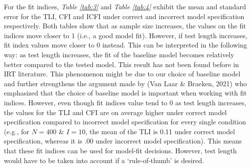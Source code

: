 \documentclass[Royal,sageapa,times,doublespace]{sagej}
\begin{document}
\indent For the fit indices, \textit{Table \ref{tab:3}} and \textit{Table \ref{tab:4}} exhibit the mean and standard error for the TLI, CFI and ICFI under correct and incorrect model specification respectively. Both tables show that as sample size increases, the values on the fit indices move closer to 1 (i.e., a good model fit). However, if test length increases, fit index values move closer to 0 instead. This can be interpreted in the following way: as test length increases, the fit of the baseline model becomes relatively better compared to the tested model. This result has not been found before in IRT literature. This phenomenon might be due to our choice of baseline model and further strengthens the argument made by (Van Laar \& Braeken, 2021) who emphasized that the choice of baseline model is important when working with fit indices. However, even though fit indices value tend to 0 as test length increases, the values for the TLI and CFI are on average higher under correct model specification compared to incorrect model specification for every single condition (e.g., for $N = 400$ \& $I = 10$, the mean of the TLI is 0.11 under correct model specification, whereas it is .00 under incorrect model specification). This means that these fit indices can be used for model-fit decisions. However, test length would have to be taken into account if a `rule-of-thumb' is desired. \\
\end{document}
